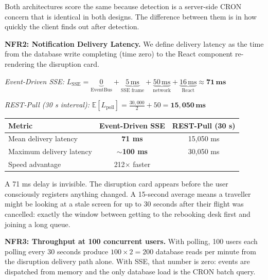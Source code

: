 \documentclass[12pt,a4paper]{article}
\begin{document}
Both architectures score the same because detection is a server-side CRON concern that is
identical in both designs. The difference between them is in how quickly the client finds out
after detection.

\vspace{1em}
\textbf{NFR2: Notification Delivery Latency.}
We define delivery latency as the time from the database write completing (time zero) to the
React component re-rendering the disruption card.

\vspace{0.3em}
\textit{Event-Driven SSE:}
$L_{\text{SSE}} = \underbrace{0}_{\text{EventBus}} + \underbrace{5\,\text{ms}}_{\text{SSE frame}} + \underbrace{50\,\text{ms}}_{\text{network}} + \underbrace{16\,\text{ms}}_{\text{React}} \approx \mathbf{71\,\text{ms}}$

\vspace{0.3em}
\textit{REST-Pull (30 s interval):}
$\mathbb{E}[L_{\text{poll}}] = \tfrac{30{,}000}{2} + 50 = \mathbf{15{,}050\,\text{ms}}$

\begin{center}
\begin{tabular}{@{}lcc@{}}
\toprule
\textbf{Metric} & \textbf{Event-Driven SSE} & \textbf{REST-Pull (30 s)} \\
\midrule
Mean delivery latency & \textcolor{successgreen}{\textbf{71 ms}} & \textcolor{warningorange}{15,050 ms} \\
Maximum delivery latency & \textcolor{successgreen}{\textbf{$\sim$100 ms}} & \textcolor{warningorange}{30,050 ms} \\
Speed advantage & 212$\times$ faster & \\
\bottomrule
\end{tabular}
\end{center}

A 71 ms delay is invisible. The disruption card appears before the user consciously registers
anything changed. A 15-second average means a traveller might be looking at a stale screen for
up to 30 seconds after their flight was cancelled: exactly the window between getting to the
rebooking desk first and joining a long queue.

\vspace{1em}
\textbf{NFR3: Throughput at 100 concurrent users.}
With polling, 100 users each polling every 30 seconds produce $100 \times 2 = 200$ database reads
per minute from the disruption delivery path alone. With SSE, that number is zero: events are
dispatched from memory and the only database load is the CRON batch query.
\end{document}
